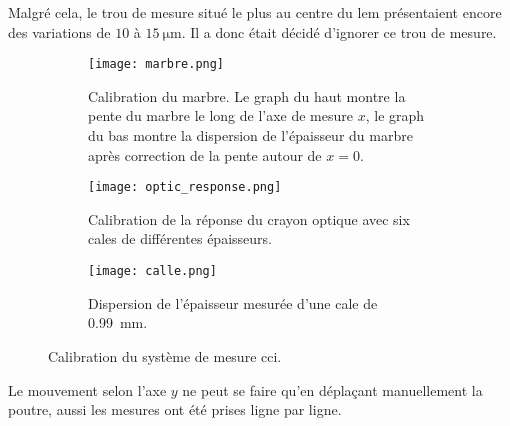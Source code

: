                    Malgré cela, le trou de mesure situé le plus au centre du \gls{lem} présentaient encore des variations de $10$ à $\SI{15}{\micro\meter}$. Il a donc était décidé d'ignorer ce trou de mesure.
                    
                    \begin{figure}[htpb]
                        \begin{minipage}{0.56\textwidth}
                           \begin{subfigure}[t]{\textwidth} \texttt{[image: marbre.png]}
                            \caption[Calibration du marbre.]{Calibration du marbre. Le graph du haut montre la pente du marbre le long de l'axe de mesure $x$, le graph du bas montre la dispersion de l'épaisseur du marbre après correction de la pente autour de $x=0$.}
                            \label{fig::marbre}
                            \end{subfigure}
                        \end{minipage}
                        \hfill
                        \begin{minipage}{0.38\textwidth}
                            \begin{subfigure}[t]{\textwidth}
                                \texttt{[image: optic\_response.png]}
                                \caption[Calibration de la réponse du crayon optique.]{Calibration de la réponse du crayon optique avec six cales de différentes épaisseurs.}
                                \label{fig::optic_response}
                            \end{subfigure}
                            \begin{subfigure}[t]{\textwidth}
                                \texttt{[image: calle.png]}
                                \caption[Dispersion de l'épaisseur mesurée d'une cale de \SI{0.99}{\milli\meter}.]{Dispersion de l'épaisseur mesurée d'une cale de \SI{0.99}{\milli\meter}.}
                                \label{fig::calle}
                            \end{subfigure}
                        \end{minipage}
                        \caption[Calibration du système de mesure \gls{cci}.]{Calibration du système de mesure \gls{cci}.}
                        \label{fig::calibration}
                    \end{figure}
                    Le mouvement selon l'axe $y$ ne peut se faire qu'en déplaçant manuellement la poutre, aussi les mesures ont été prises ligne par ligne.
                    
